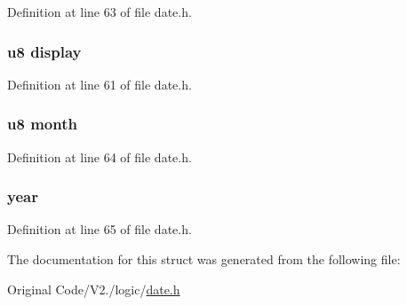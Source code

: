 \-Definition at line 63 of file date.\-h.

\hypertarget{structdate_a38f8f410104c7551db27a14196c8e15c}{
\subsubsection[{display}]{\setlength{\rightskip}{0pt plus 5cm}u8 {\bf display}}}\label{structdate_a38f8f410104c7551db27a14196c8e15c}


\-Definition at line 61 of file date.\-h.

\hypertarget{structdate_ad5f8cd6773aef677b920ae4e4265bb10}{
\subsubsection[{month}]{\setlength{\rightskip}{0pt plus 5cm}u8 {\bf month}}}\label{structdate_ad5f8cd6773aef677b920ae4e4265bb10}


\-Definition at line 64 of file date.\-h.

\hypertarget{structdate_a5f976764bc633de731704ebdaf334b0b}{
\subsubsection[{year}]{ {\bf year}}}\label{structdate_a5f976764bc633de731704ebdaf334b0b}


\-Definition at line 65 of file date.\-h.



\-The documentation for this struct was generated from the following file\-:\begin{DoxyCompactItemize}
\item 
\-Original Code/\-V2./logic/\hyperlink{date_8h}{date.\-h}\end{DoxyCompactItemize}
